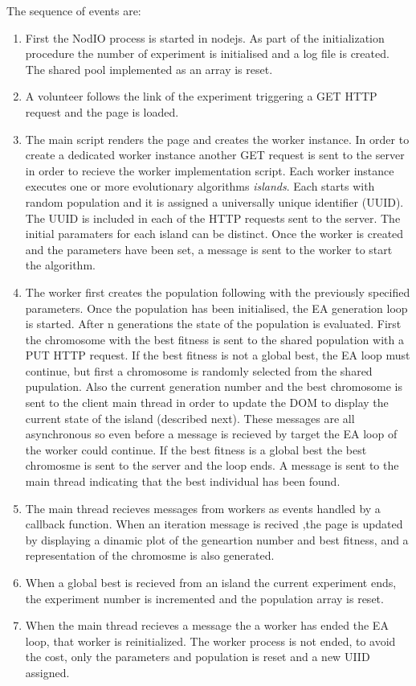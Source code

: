 \documentclass[journal,onecolumn]{IEEEtran}
\begin{document}
The sequence of events are:
\begin{enumerate}
\item First the NodIO process is started in nodejs. As part of the 
initialization procedure the number of experiment is initialised and a log 
file is created. The shared pool implemented as an array is reset.
\item A volunteer follows the link of the experiment triggering a GET HTTP 
request and the page is loaded.
\item The main script renders the page and creates the worker instance. In 
order to create a dedicated worker instance another GET request is sent to the 
server in order to recieve the worker implementation script. 
Each worker instance executes one or more evolutionary algorithms 
{\em islands}. Each starts with random population and it is assigned a 
universally unique  identifier (UUID). The UUID is included in each of the HTTP
requests sent to the server.  
The initial paramaters for each island
can be distinct. Once the worker is created and the parameters have been set,
a message is sent to the worker to start the algorithm.
\item The worker first creates the population following with the previously 
specified parameters. Once the population has been initialised, the EA 
generation loop is started. After n generations the state of the population 
is evaluated. First the chromosome with the best fitness is sent to the shared
population with a PUT HTTP request. If the best fitness is not a global best,
the EA loop must continue, but first a chromosome is randomly selected from 
the shared pupulation. Also the current generation number and the best 
chromosome is sent to the client main thread in order to update the DOM to 
display the current state of the island (described next). These messages are
all asynchronous so even before a message is recieved by target the EA loop of
the worker could continue. If the best fitness is a global best the best 
chromosme is sent to the server and the loop ends. A message is sent to the 
main thread indicating that the best individual has been found.
\item The main thread recieves messages from workers as events handled by 
a callback function. When an iteration message is recived ,the page is 
updated by displaying a dinamic plot of the geneartion number and best 
fitness, and a representation of the chromosme is also generated.   
\item When a global best is recieved from an island the current experiment 
ends, the experiment number is incremented and the population array is reset.  
\item When the main thread recieves a message the a worker has ended the EA
loop, that worker is reinitialized. The worker process is not ended, to
avoid the cost, only the parameters and population is reset and a new UIID 
assigned.
\end{enumerate}
\end{document}
